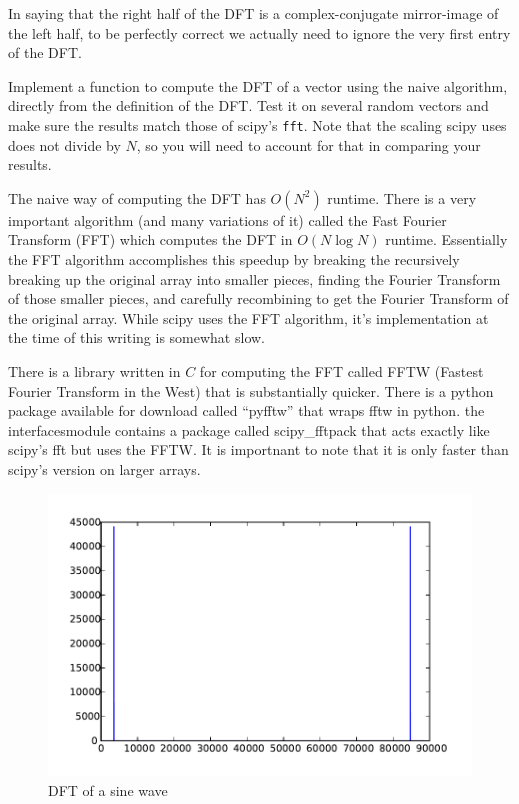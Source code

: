 In saying that the right half of the DFT is a complex-conjugate mirror-image of the left half, to be perfectly correct we actually need to ignore the very first entry of the DFT.


\begin{problem}
Implement a function to compute the DFT of a vector using the naive algorithm, directly from the definition of the DFT. Test it on several random vectors and make sure the results match those of scipy's \texttt{fft}.  Note that the scaling scipy uses does not divide by $N$, so you will need to account for that in comparing your results.
\end{problem}

The naive way of computing the DFT has $O(N^2)$ runtime.  There is a very important algorithm (and many variations of it) called the Fast Fourier Transform (FFT) which computes the DFT in $O(N \log N)$ runtime.  Essentially the FFT algorithm accomplishes this speedup by breaking the recursively breaking up the original array into smaller pieces, finding the Fourier Transform of those smaller pieces, and carefully recombining to get the Fourier Transform of the original array.  While scipy uses the FFT algorithm, it's implementation at the time of this writing is somewhat slow.

There is a library written in $C$ for computing the FFT called FFTW (Fastest Fourier Transform in the West) that is substantially quicker.  There is a python package available for download called ``pyfftw'' that wraps fftw in python. the interfacesmodule contains a package called scipy_fftpack that acts exactly like scipy's fft but uses the FFTW. It is importnant to note that it is only faster than scipy's version on larger arrays.

\begin{figure}[ht]\caption{DFT of a sine wave}\label{sinespec}\centering\includegraphics[width=\textwidth]{sinespec}\end{figure}

